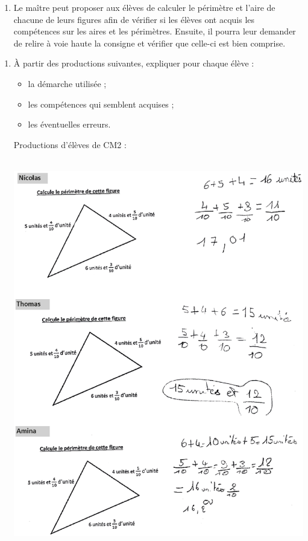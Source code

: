{\begin{corrige}
\begin{enumerate}
\begin{enumerate}
      \item Le maître peut proposer aux élèves de calculer le périmètre et l'aire de chacune de leurs figures afin de vérifier si les élèves ont acquis les compétences sur les aires et les périmètres. Ensuite, il pourra leur demander de relire à voie haute la consigne et vérifier que celle-ci est bien comprise.
   \end{enumerate}
\end{enumerate}
\end{corrige}

\bigskip


\begin{exercice}[CRPE 2018 G1]
\begin{enumerate}
   \item À partir des productions suivantes, expliquer pour chaque élève :
   \begin{itemize}
      \item la démarche utilisée ;
      \item les compétences qui semblent acquises ;
      \item les éventuelles erreurs.
   \end{itemize}
   Productions d’élèves de CM2 : \\
   \begin{center}
      \includegraphics[height=17cm]{Grandeurs_mesures_did/Images/Grm7_analyse_perimetre} \\ [5mm]

\end{center}
\end{enumerate}
\end{exercice}}
